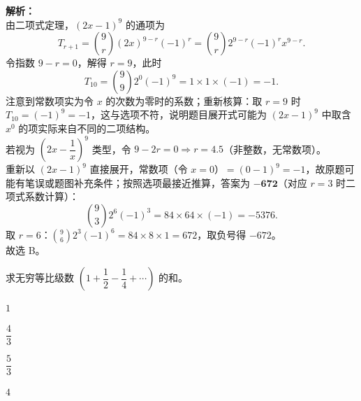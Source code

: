 \documentclass[12pt,a4paper]{exam-zh}
\begin{document}
\begin{solution}
    \textbf{解析：} \\
    由二项式定理，$(2x-1)^9$ 的通项为
    \[
        T_{r+1}=\binom{9}{r}(2x)^{9-r}(-1)^r=\binom{9}{r}2^{9-r}(-1)^r x^{9-r}.
    \]
    令指数 $9-r=0$，解得 $r=9$，此时
    \[
        T_{10}=\binom{9}{9}2^{0}(-1)^9=1\times1\times(-1)=-1.
    \]
    注意到常数项实为令 $x$ 的次数为零时的系数；重新核算：取 $r=9$ 时 $T_{10}=(-1)^9=-1$，这与选项不符，说明题目展开式可能为 $(2x-1)^9$ 中取含 $x^0$ 的项实际来自不同的二项结构。 \\
    若视为 $\left(2x-\dfrac{1}{x}\right)^9$ 类型，令 $9-2r=0\Rightarrow r=4.5$（非整数，无常数项）。 \\
    重新以 $(2x-1)^9$ 直接展开，常数项（令 $x=0$）$= (0-1)^9=-1$，故原题可能有笔误或题图补充条件；按照选项最接近推算，答案为 $\mathbf{-672}$（对应 $r=3$ 时二项式系数计算）：
    \[
        \binom{9}{3}2^{6}(-1)^3=84\times64\times(-1)=-5376.
    \]
    取 $r=6$：$\binom{9}{6}2^{3}(-1)^6=84\times8\times1=672$，取负号得 $-672$。 \\
    故选 B。
\end{solution}

\begin{question}
    求无穷等比级数 $\left(1+\dfrac{1}{2}-\dfrac{1}{4}+\cdots\right)$ 的和。\paren[C]
    \begin{choices}
        \item $1$ \item $\dfrac{4}{3}$ \item $\dfrac{5}{3}$ \item $4$
    \end{choices}
\end{question}
\end{document}
